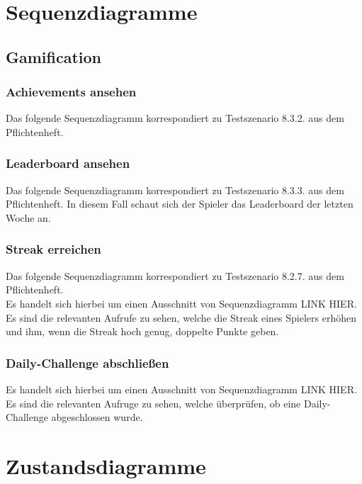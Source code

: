 \documentclass[a4paper]{scrreprt}
\begin{document}
	\chapter{Sequenzdiagramme}


	\section{Gamification}

	\subsection{Achievements ansehen}
	Das folgende Sequenzdiagramm korrespondiert zu Testszenario 8.3.2. aus dem Pflichtenheft. \\

	\subsection{Leaderboard ansehen}
	Das folgende Sequenzdiagramm korrespondiert zu Testszenario 8.3.3. aus dem Pflichtenheft. In diesem Fall schaut sich der Spieler das Leaderboard der letzten Woche an.\\

	\subsection{Streak erreichen}
	Das folgende Sequenzdiagramm korrespondiert zu Testszenario 8.2.7. aus dem Pflichtenheft. \\
	Es handelt sich hierbei um einen Ausschnitt von Sequenzdiagramm LINK HIER. Es sind die relevanten Aufrufe zu sehen, welche die Streak eines Spielers erhöhen und ihm, wenn die Streak hoch genug, doppelte Punkte geben. \\

	\subsection{Daily-Challenge abschließen}
	Es handelt sich hierbei um einen Ausschnitt von Sequenzdiagramm LINK HIER. Es sind die relevanten Aufruge zu sehen, welche überprüfen, ob eine Daily-Challenge abgeschlossen wurde. \\



	\chapter{Zustandsdiagramme}
\end{document}
